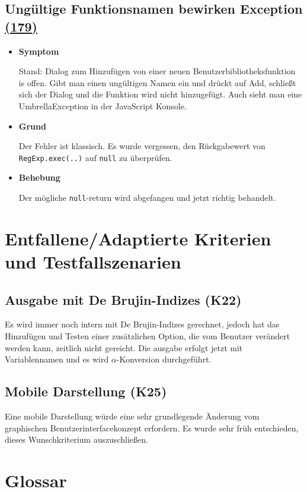 \documentclass[parskip=full,11pt,twoside]{scrartcl}
\newcommand{\issueref}[1]{
    \href{https://git.scc.kit.edu/ap/Aurora/issues/#1}{(#1)}
}
\newcommand{\regrtest}[5]{
    \subsection{#1 \issueref{#2}}
    \begin{itemize}
        \item \textbf{Symptom}
            #3
        \item \textbf{Grund}
            #4
        \item \textbf{Behebung}
            #5
    \end{itemize}
}
\begin{document}
    \regrtest{Ungültige Funktionsnamen bewirken Exception}{179}{
        Stand: Dialog zum Hinzufügen von einer neuen Benutzerbibliotheksfunktion is offen.
        Gibt man einen ungültigen Namen ein und drückt auf Add, schließt sich der Dialog und die Funktion wird nicht
        hinzugefügt. Auch sieht man eine UmbrellaException in der JavaScript Konsole.
    }{
        Der Fehler ist klassisch. Es wurde vergessen, den Rückgabewert von \texttt{RegExp.exec(..)} auf \texttt{null} zu überprüfen.
    }{
        Der mögliche \texttt{null}-return wird abgefangen und jetzt richtig behandelt.
  }

    \section{Entfallene/Adaptierte Kriterien und Testfallszenarien}
    \subsection{Ausgabe mit De Brujin-Indizes (K22)}
    Es wird immer noch intern mit De Brujin-Indizes gerechnet, jedoch hat das Hinzufügen und Testen einer zusätzlichen
    Option, die vom Benutzer verändert werden kann, zeitlich nicht gereicht.
    Die ausgabe erfolgt jetzt mit Variablennamen und es wird $\alpha$-Konversion durchgeführt.


    \subsection{Mobile Darstellung (K25)}
    Eine mobile Darstellung würde eine sehr grundlegende Änderung vom graphischen Benutzerinterfacekonzept erfordern.
    Es wurde sehr früh entschieden, dieses Wunschkriterium auszuschließen.

    \section{Glossar}
\end{document}
